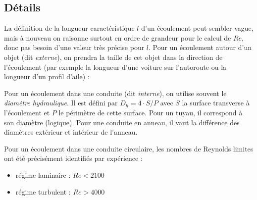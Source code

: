 \subsection{Détails}\label{sec:Re_details}
La définition de la longueur caractéristique $l$ d'un écoulement peut sembler vague, mais à nouveau on raisonne surtout en ordre de grandeur pour le calcul de $Re$, donc pas besoin d'une valeur très précise pour $l$. Pour un écoulement autour d'un objet (dit \textit{externe}), on prendra la taille de cet objet dans la direction de l'écoulement (par exemple la longueur d'une voiture sur l'autoroute ou la longueur d'un profil d'aile) :
%
\begin{center}
\end{center}
%
Pour un écoulement dans une conduite (dit \textit{interne}), on utilise souvent le \textit{diamètre hydraulique}. Il est défini par $D_h = 4 \cdot S/P$ avec $S$ la surface transverse à l'écoulement et $P$ le périmètre de cette surface. Pour un tuyau, il correspond à son diamètre (logique). Pour une conduite en anneau, il vaut la différence des diamètres extérieur et intérieur de l'anneau.

Pour un écoulement dans une conduite circulaire, les nombres de Reynolds limites ont été précisément identifiés par expérience :
\begin{itemize}
    \item régime laminaire : $Re<2100$
    \item régime turbulent : $Re>4000$
\end{itemize}
